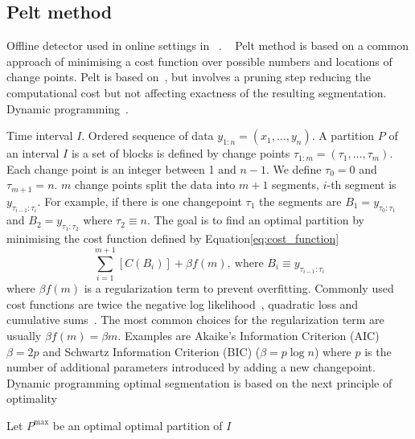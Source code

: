 \documentclass[doctoral,utf8,lot,loar,lof,shortloft,index]{jydiss}
\begin{document}
\subsection{Pelt method}

Offline detector used in online settings in ~\cite{marrero2013aclac}.
~\cite{killick2012optimal}
Pelt method is based on a common approach of  minimising a cost function over possible numbers and locations of change points.
Pelt is based on~\cite{jackson2005algorithm}, but involves a pruning step reducing the computational cost but not affecting exactness of the resulting segmentation.
Dynamic programming~\cite{bellman1966dynamic}.

Time interval $I$.
Ordered sequence of data $y_{1:n}=(x_1,\dots,y_n)$.
A partition $P$ of an interval $I$ is a set of blocks is defined  by change points $\tau_{1:m}=(\tau_1, \dots, \tau_m)$.
Each change point is an integer between 1 and $n-1$.
We define $\tau_0=0$ and $\tau_{m+1}=n$.
$m$ change points split the data into $m+1$ segments, $i$-th segment is $y_{\tau_{i-1} : \tau_i}$.
For example, if there is one changepoint $\tau_1$ the segments are $B_1=y_{\tau_0:\tau_1}$ and $B_2=y_{\tau_1:\tau_2}$ where $\tau_2 \equiv n$.
The goal is to find an optimal partition by minimising the cost function defined by Equation\ref{eq:cost_function}
\begin{equation}\label{eq:cost_function}
	\sum_{i=1}^{m+1} [ C(B_i) ] + \beta f(m),\: \text{where } B_i \equiv y_{\tau_{i-1} : \tau_i}
\end{equation}
where $\beta f(m)$ is a regularization term to prevent overfitting.
Commonly used cost functions are twice the negative log likelihood~\cite{guyon1999underfitting,chen2011parametric},
quadratic loss and cumulative sums~\cite{inclan1994use, rigaill2010pruned}.
The most common choices for the regularization term are usually $\beta f(m) = \beta m$.
Examples are Akaike's Information Criterion (AIC\cite{akaike1974new}) $\beta=2p$ and Schwartz Information Criterion (BIC\cite{schwarz1978estimating}) ($\beta = p \log{n}$) where $p$ is the number of additional parameters introduced by adding a new changepoint.
Dynamic programming optimal segmentation is based on the next principle of optimality
\begin{theorem}
Let $P^{\text{max}}$ be an optimal optimal partition of $I$
\end{theorem}
\end{document}
